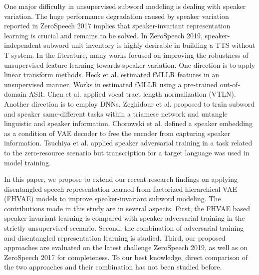 \documentclass[a4paper]{article}
\begin{document}
One major difficulty  in unsupervised subword modeling is dealing with speaker variation. The huge  performance degradation caused by speaker variation reported in ZeroSpeech 2017 \cite{dunbar2017zero} implies that speaker-invariant  representation learning is crucial and remains to be solved. In ZeroSpeech 2019, speaker-independent subword unit inventory  is  highly desirable in building a TTS without T system. 
In the literature, many works focused on improving the robustness of unsupervised feature learning towards speaker variation.
One direction is to apply  linear transform methods. Heck et al. \cite{heck2017feature} estimated fMLLR features in an unsupervised manner. Works in \cite{shibata2017composite,Feng2018exploiting} estimated fMLLR using a pre-trained out-of-domain ASR. Chen et al. \cite{chen2017multilingual} applied vocal tract length normalization (VTLN).
Another direction is to employ DNNs. Zeghidour et al. \cite{Zeghidour+2016} proposed to train subword and speaker same-different tasks within a triamese network and untangle linguistic and speaker information. Chorowski et al. \cite{Chorowski2019unsup} defined a speaker embedding as a condition of VAE decoder to free the encoder from capturing speaker information. Tsuchiya et al. \cite{Tsuchiya2018speaker} applied speaker adversarial training in a  task related to the zero-resource scenario but transcription for a target language was used in model training.

In this paper, we propose to extend our recent research findings \cite{Feng2019improving_arxiv} on applying disentangled speech representation learned from factorized hierarchical VAE (FHVAE) models \cite{hsu2017nips}  to improve speaker-invariant subword modeling. The contributions made in this study are in several aspects. 
First, the  FHVAE based speaker-invariant learning  is compared with  speaker adversarial training in the strictly unsupervised scenario. 
Second, the combination of adversarial training and disentangled representation learning is studied.  
Third, our proposed approaches are evaluated on the latest challenge ZeroSpeech 2019, as well as on ZeroSpeech 2017 for completeness.
To our best knowledge, direct comparison of the two approaches and their combination has not been studied before.
\end{document}
